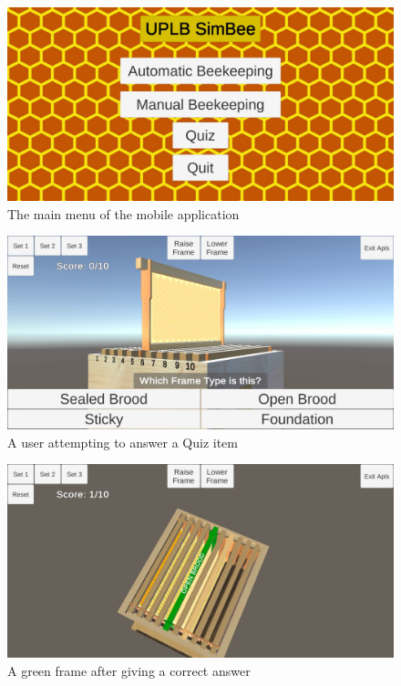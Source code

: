\documentclass[journal]{./IEEE/IEEEtran}
\begin{document}
\begin{figure}[H]
\includegraphics[scale=0.17]{./images/output-main-menu.jpg}
\centering
\caption{The main menu of the mobile application}
\end{figure}

\begin{figure}[H]
\includegraphics[scale=0.17]{./images/quiz-game-1.jpg}
\centering
\caption{A user attempting to answer a Quiz item}
\end{figure}

\begin{figure}[H]
\includegraphics[scale=0.17]{./images/quiz-game-2.jpg}
\centering
\caption{A green frame after giving a correct answer}
\end{figure}
\end{document}
